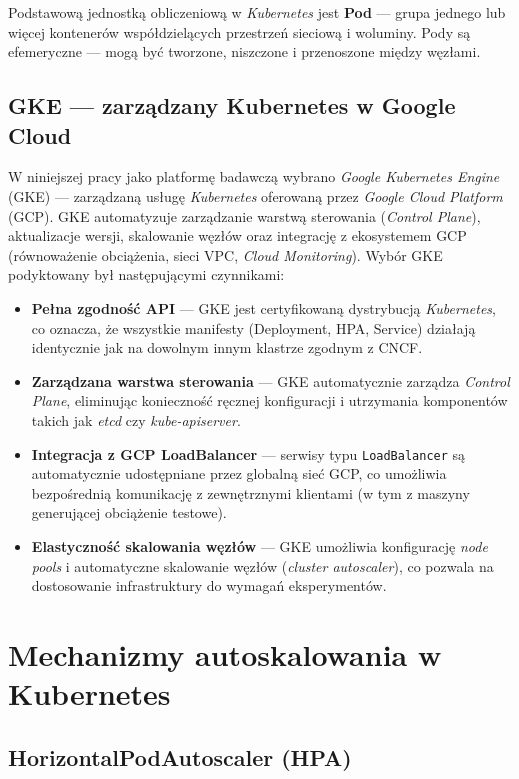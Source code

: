 Podstawową jednostką obliczeniową w \textit{Kubernetes} jest \textbf{Pod} — grupa jednego lub więcej kontenerów współdzielących przestrzeń sieciową i woluminy. Pody są efemeryczne — mogą być tworzone, niszczone i przenoszone między węzłami.

\subsection{GKE — zarządzany Kubernetes w Google Cloud}

W niniejszej pracy jako platformę badawczą wybrano \textit{Google Kubernetes Engine} (GKE) — zarządzaną usługę \textit{Kubernetes} oferowaną przez \textit{Google Cloud Platform} (GCP). GKE automatyzuje zarządzanie warstwą sterowania (\textit{Control Plane}), aktualizacje wersji, skalowanie węzłów oraz integrację z ekosystemem GCP (równoważenie obciążenia, sieci VPC, \textit{Cloud Monitoring}). Wybór GKE podyktowany był następującymi czynnikami:

\begin{itemize}
  \item \textbf{Pełna zgodność API} — GKE jest certyfikowaną dystrybucją \textit{Kubernetes}, co oznacza, że wszystkie manifesty (Deployment, HPA, Service) działają identycznie jak na dowolnym innym klastrze zgodnym z CNCF.
  \item \textbf{Zarządzana warstwa sterowania} — GKE automatycznie zarządza \textit{Control Plane}, eliminując konieczność ręcznej konfiguracji i utrzymania komponentów takich jak \textit{etcd} czy \textit{kube-apiserver}.
  \item \textbf{Integracja z GCP LoadBalancer} — serwisy typu \texttt{LoadBalancer} są automatycznie udostępniane przez globalną sieć GCP, co umożliwia bezpośrednią komunikację z zewnętrznymi klientami (w tym z maszyny generującej obciążenie testowe).
  \item \textbf{Elastyczność skalowania węzłów} — GKE umożliwia konfigurację \textit{node pools} i automatyczne skalowanie węzłów (\textit{cluster autoscaler}), co pozwala na dostosowanie infrastruktury do wymagań eksperymentów.
\end{itemize}

\section{Mechanizmy autoskalowania w Kubernetes}

\subsection{HorizontalPodAutoscaler (HPA)}

